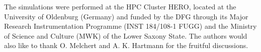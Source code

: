 The simulations were performed at the HPC Cluster HERO, located at
the University of Oldenburg (Germany) and funded by the DFG through
its Major Research Instrumentation Programme (INST 184/108-1 FUGG)
and the Ministry of Science and Culture (MWK) of the Lower Saxony
State.
The authors would also like to thank O. Melchert and A. K. Hartmann
for the fruitful discussions.
